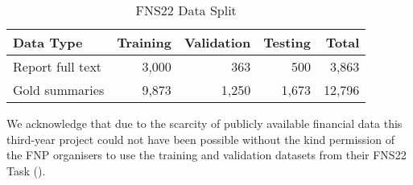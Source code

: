 \begin{table}[h]
    \centering
    \begin{tabular}{lrrr r}
        \hline
        Data Type & Training & Validation & Testing & Total \\
        \midrule
        Report full text & 3,000 & 363 & 500 & 3,863 \\
        Gold summaries & 9,873 & 1,250 & 1,673 & 12,796 \\
        \bottomrule
    \end{tabular}
    \caption{FNS22 Data Split}
    \label{tab:fns22-data}
\end{table}

We acknowledge that due to the scarcity of publicly available financial data this third-year project could not have been possible without the kind permission of the FNP organisers to use the training and validation datasets from their FNS22 Task (\cite{fnp-2022-financial}).

